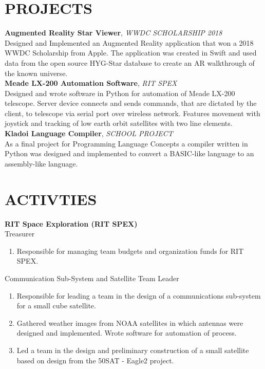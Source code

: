 \documentclass[line, margin]{res}
\begin{document}
\begin{resume}
\section{PROJECTS}
\textbf{Augmented Reality Star Viewer}, \textit{WWDC SCHOLARSHIP 2018}\\
Designed and Implemented an Augmented Reality application that won a 2018 WWDC Scholarship from Apple.  The application was created in Swift and used data from the open source HYG-Star database to create an AR walkthrough of the known universe.
\\ [10pt]
\textbf{Meade LX-200 Automation Software}, \textit{RIT SPEX}\\
Designed and wrote software in Python for automation of Meade LX-200 telescope. Server device connects and sends commands, that are dictated by the client, to telescope via serial port over wireless network. Features movement with joystick and tracking of low earth orbit satellites with two line elements.
\\ [10pt]
\textbf{Kladoi Language Compiler}, \textit{SCHOOL PROJECT}\\
As a final project for Programming Language Concepts a compiler written in Python was designed and implemented to convert a BASIC-like language to an assembly-like language.

\section{ACTIVTIES}
\textbf{RIT Space Exploration (RIT SPEX)}\\
Treasurer
      \begin{enumerate}
        \item[] Responsible for managing team budgets and organization funds for RIT SPEX.
      \end{enumerate}
      
Communication Sub-System and  Satellite Team Leader
      \begin{enumerate}
        \item[] Responsible for leading a team in the design of a communications sub-system for a small cube satellite.
        \item[] Gathered weather images from NOAA satellites in which antennas were designed and implemented. Wrote software for automation of process.
        \item[] Led a team in the design and preliminary construction of a small satellite based on design from the \textdollar 50SAT - Eagle2 project.
      \end{enumerate}
      


\end{resume}
\end{document}

